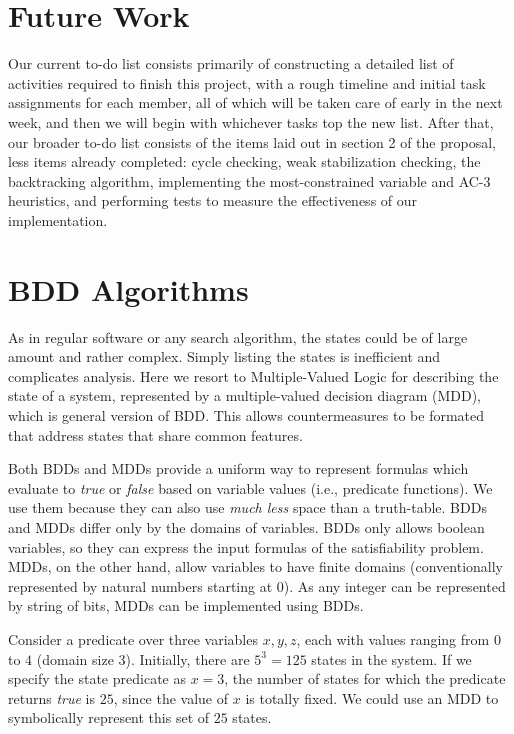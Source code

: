 \section{Future Work}

Our current to-do list consists primarily of constructing a detailed list of activities required to finish this project, with a rough timeline 
and initial task assignments for each member, all of which will be taken care of early in the next week, and then we will begin with whichever tasks top
the new list.  After that, our broader to-do list consists of the items laid out in section 2 of the proposal, less items already completed:
cycle checking, weak stabilization checking, the backtracking algorithm, implementing the most-constrained variable and AC-3 heuristics, and performing
tests to measure the effectiveness of our implementation.

\section{BDD Algorithms}
As in regular software or any search algorithm, the states could be of large amount and rather complex. Simply listing the states is inefficient and complicates analysis. Here we resort to Multiple-Valued Logic for describing the state of a system, represented by a multiple-valued decision diagram (MDD), which is general version of BDD. This allows countermeasures to be formated that address states that share common features. 

Both BDDs and MDDs provide a uniform way to represent formulas which evaluate to {\it true} or {\it false} based on variable values (i.e., predicate functions).
We use them because they can also use {\em much less} space than a truth-table.
BDDs and MDDs differ only by the domains of variables. BDDs only allows boolean variables, so they can express the input formulas of the satisfiability problem.
MDDs, on the other hand, allow variables to have finite domains (conventionally represented by natural numbers starting at $0$).
As any integer can be represented by string of bits, MDDs can be implemented using BDDs.

Consider a predicate over three variables $x, y, z$, each with values ranging from $0$ to $4$ (domain size 3). Initially, there are $5^3 = 125$ states in the system. If we specify the state predicate as $x=3$, the number of states for which the predicate returns {\it true} is $25$, since the value of $x$ is totally fixed. We could use an MDD to symbolically represent this set of $25$ states.


